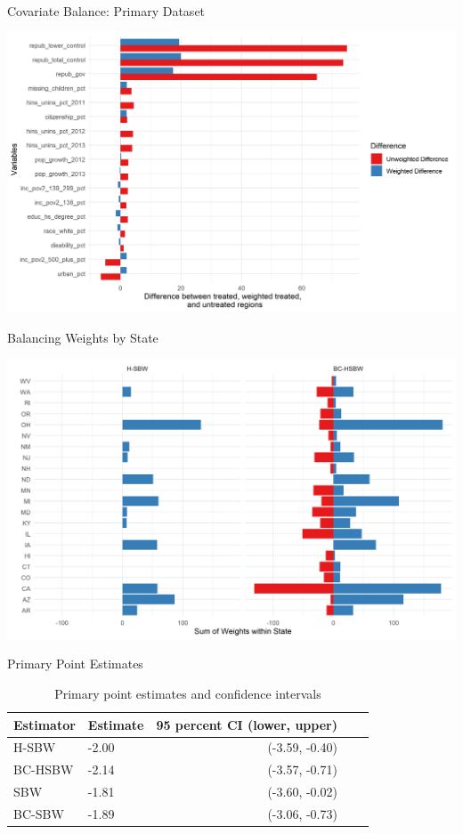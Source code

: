\documentclass[hyperref={pdfpagelabels=false}]{beamer}
\begin{document}
\begin{frame}{Covariate Balance: Primary Dataset}
    \begin{center}
	\includegraphics[scale=0.5]{01_Plots/balance-plot-etuc1.png}
    \end{center}
\end{frame}

\begin{frame}{Balancing Weights by State}
    \begin{center}
	\includegraphics[scale=0.5]{01_Plots/weights-by-state-hsbw-c1.png}
    \end{center}
\end{frame}

\begin{frame}{Primary Point Estimates}

\begin{table}[ht]
\begin{tabular}{llrll}
  \toprule
Estimator & Estimate & 95 percent CI (lower, upper)\\ 
  \midrule
  H-SBW & -2.00 & (-3.59, -0.40) \\ 
  BC-HSBW & -2.14 & (-3.57, -0.71) \\ 
  SBW & -1.81 & (-3.60, -0.02) \\ 
  BC-SBW & -1.89 & (-3.06, -0.73) \\ 
   \bottomrule
\end{tabular}
\caption{Primary point estimates and confidence intervals}
\label{tab:confintmain}
\end{table}
\end{frame}
\end{document}
